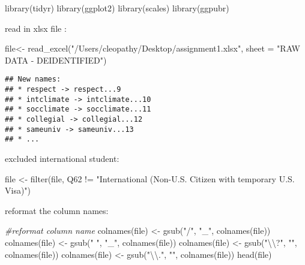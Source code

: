 \documentclass[
]{article}
\newenvironment{Shaded}{\begin{snugshade}}{\end{snugshade}}
\newcommand{\AttributeTok}[1]{\textcolor[rgb]{0.77,0.63,0.00}{#1}}
\newcommand{\CommentTok}[1]{\textcolor[rgb]{0.56,0.35,0.01}{\textit{#1}}}
\newcommand{\FunctionTok}[1]{\textcolor[rgb]{0.00,0.00,0.00}{#1}}
\newcommand{\NormalTok}[1]{#1}
\newcommand{\OtherTok}[1]{\textcolor[rgb]{0.56,0.35,0.01}{#1}}
\newcommand{\SpecialCharTok}[1]{\textcolor[rgb]{0.00,0.00,0.00}{#1}}
\newcommand{\StringTok}[1]{\textcolor[rgb]{0.31,0.60,0.02}{#1}}
\begin{document}
\begin{Shaded}
\begin{Highlighting}[]
\FunctionTok{library}\NormalTok{(tidyr)}
\FunctionTok{library}\NormalTok{(ggplot2)}
\FunctionTok{library}\NormalTok{(scales)}
\FunctionTok{library}\NormalTok{(ggpubr)}
\end{Highlighting}
\end{Shaded}

read in xlsx file :

\begin{Shaded}
\begin{Highlighting}[]
\NormalTok{file}\OtherTok{\textless{}{-}} \FunctionTok{read\_excel}\NormalTok{(}\StringTok{"/Users/cleopathy/Desktop/assignment1.xlsx"}\NormalTok{, }\AttributeTok{sheet =} \StringTok{"RAW DATA {-} DEIDENTIFIED"}\NormalTok{)}
\end{Highlighting}
\end{Shaded}

\begin{verbatim}
## New names:
## * respect -> respect...9
## * intclimate -> intclimate...10
## * socclimate -> socclimate...11
## * collegial -> collegial...12
## * sameuniv -> sameuniv...13
## * ...
\end{verbatim}

excluded international student:

\begin{Shaded}
\begin{Highlighting}[]
\NormalTok{file }\OtherTok{\textless{}{-}} \FunctionTok{filter}\NormalTok{(file, Q62 }\SpecialCharTok{!=} \StringTok{"International (Non{-}U.S. Citizen with temporary U.S. Visa)"}\NormalTok{)}
\end{Highlighting}
\end{Shaded}

reformat the column names:

\begin{Shaded}
\begin{Highlighting}[]
\CommentTok{\#reformat column name}
\FunctionTok{colnames}\NormalTok{(file) }\OtherTok{\textless{}{-}} \FunctionTok{gsub}\NormalTok{(}\StringTok{"/"}\NormalTok{, }\StringTok{"\_"}\NormalTok{, }\FunctionTok{colnames}\NormalTok{(file))}
\FunctionTok{colnames}\NormalTok{(file) }\OtherTok{\textless{}{-}} \FunctionTok{gsub}\NormalTok{(}\StringTok{" "}\NormalTok{, }\StringTok{"\_"}\NormalTok{, }\FunctionTok{colnames}\NormalTok{(file))}
\FunctionTok{colnames}\NormalTok{(file) }\OtherTok{\textless{}{-}} \FunctionTok{gsub}\NormalTok{(}\StringTok{"}\SpecialCharTok{\textbackslash{}\textbackslash{}}\StringTok{?"}\NormalTok{, }\StringTok{""}\NormalTok{, }\FunctionTok{colnames}\NormalTok{(file))}
\FunctionTok{colnames}\NormalTok{(file) }\OtherTok{\textless{}{-}} \FunctionTok{gsub}\NormalTok{(}\StringTok{"}\SpecialCharTok{\textbackslash{}\textbackslash{}}\StringTok{."}\NormalTok{, }\StringTok{""}\NormalTok{, }\FunctionTok{colnames}\NormalTok{(file))}
\FunctionTok{head}\NormalTok{(file)}
\end{Highlighting}
\end{Shaded}
\end{document}
